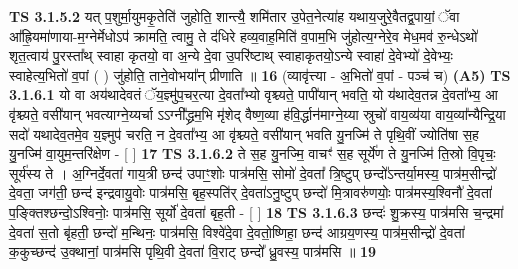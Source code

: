 \documentclass[17pt]{extarticle}
\begin{document}
                  \newline
                                \textbf{ TS 3.1.5.2} \newline
                  यत् प॒शुर्मा॒युमकृ॒तेति॑ जुहोति॒ शान्त्यै॒ शमि॑तार उ॒पेत॒नेत्या॑ह यथाय॒जुरे॒वैतद्व॒पायां॒ ॅवा आ᳚ह्रि॒यमा॑णाया-म॒ग्नेर्मेधोऽप॑ क्रामति॒ त्वामु॒ ते द॑धिरे हव्य॒वाह॒मिति॑ व॒पाम॒भि जु॑होत्य॒ग्नेरे॒व मेध॒मव॑ रु॒न्धेऽथो॑ शृत॒त्वाय॑ पु॒रस्ता᳚थ् स्वाहा कृतयो॒ वा अ॒न्ये दे॒वा उ॒परि॑ष्टाथ् स्वाहाकृतयो॒ऽन्ये स्वाहा॑ दे॒वेभ्यो॑ दे॒वेभ्यः॒ स्वाहेत्य॒भितो॑ व॒पां ( ) जु॑होति॒ ताने॒वोभया᳚न् प्रीणाति ॥ \textbf{  16 } \newline
                  \newline
                      (व्यावृ॑त्त्या - अ॒भितो॑ व॒पां - पञ्च॑ च)  \textbf{(A5)} \newline \newline
                                        \textbf{ TS 3.1.6.1} \newline
                  यो वा अय॑थादेवतं ॅय॒ज्ञ्मु॑प॒चर॒त्या दे॒वता᳚भ्यो वृश्च्यते॒ पापी॑यान् भवति॒ यो य॑थादेव॒तन्न दे॒वता᳚भ्य॒ आ वृ॑श्च्यते॒ वसी॑यान् भवत्याग्ने॒य्यर्चा ऽऽग्नी᳚द्ध्रम॒भि मृ॑शेद् वैष्ण॒व्या ह॑वि॒र्द्धान॑माग्ने॒य्या स्रुचो॑ वाय॒व्य॑या वाय॒व्या᳚न्यैन्द्रि॒या सदो॑ यथादेव॒तमे॒व य॒ज्ञ्मुप॑ चरति॒ न दे॒वता᳚भ्य॒ आ वृ॑श्च्यते॒ वसी॑यान् भवति यु॒नज्मि॑ ते पृथि॒वीं ज्योति॑षा स॒ह यु॒नज्मि॑ वा॒युम॒न्तरि॑क्षेण - [  ] \textbf{  17} \newline
                  \newline
                                \textbf{ TS 3.1.6.2} \newline
                  ते स॒ह यु॒नज्मि॒ वाचꣳ॑ स॒ह सूर्ये॑ण ते यु॒नज्मि॑ ति॒स्रो वि॒पृचः॒ सूर्य॑स्य ते । अ॒ग्निर्दे॒वता॑ गाय॒त्री छन्द॑ उपाꣳ॒॒शोः पात्र॑मसि॒ सोमो॑ दे॒वता᳚ त्रि॒ष्टुप् छन्दो᳚ऽन्तर्या॒मस्य॒ पात्र॑म॒सीन्द्रो॑ दे॒वता॒ जग॑ती॒ छन्द॑ इन्द्रवायु॒वोः पात्र॑मसि॒ बृह॒स्पति॑र् दे॒वता॑ऽनु॒ष्टुप् छन्दो॑ मि॒त्रावरु॑णयोः॒ पात्र॑मस्य॒श्विनौ॑ दे॒वता॑ प॒ङ्क्तिश्छन्दो॒ऽश्विनोः॒ पात्र॑मसि॒ सूर्यो॑ दे॒वता॑ बृह॒ती - [  ] \textbf{  18} \newline
                  \newline
                                \textbf{ TS 3.1.6.3} \newline
                  छन्दः॑ शु॒क्रस्य॒ पात्र॑मसि च॒न्द्रमा॑ दे॒वता॑ स॒तो बृ॑हती॒ छन्दो॑ म॒न्थिनः॒ पात्र॑मसि॒ विश्वे॑दे॒वा दे॒वतो॒ष्णिहा॒ छन्द॑ आग्रय॒णस्य॒ पात्र॑म॒सीन्द्रो॑ दे॒वता॑ क॒कुच्छन्द॑ उ॒क्थानां॒ पात्र॑मसि पृथि॒वी दे॒वता॑ वि॒राट् छन्दो᳚ ध्रु॒वस्य॒ पात्र॑मसि ॥ \textbf{  19} \newline
\end{document}
